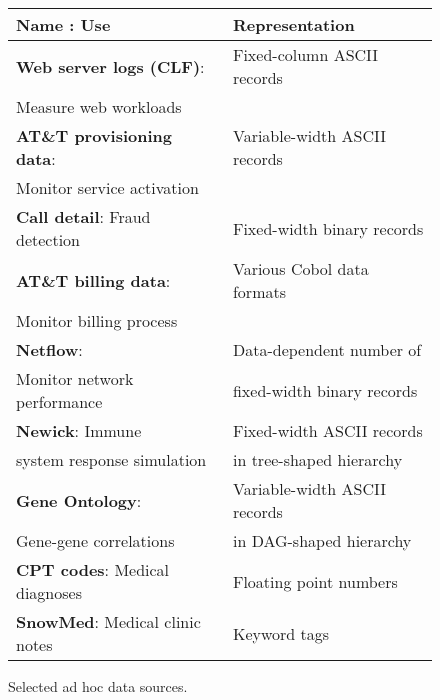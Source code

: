 \begin{figure}
\begin{center}
\begin{tabular}{l|l}
\hline
Name : Use   &  Representation               \\ \hline
\textbf{Web server logs (CLF)}:  &  Fixed-column ASCII records \\ 
Measure web workloads &                             \\ \hline
\textbf{AT\&T provisioning data}: & Variable-width ASCII records  \\ 
Monitor service activation &                              \\ \hline
\textbf{Call detail}: Fraud detection  &  Fixed-width binary records \\  \hline 
\textbf{AT\&T billing data}: & Various Cobol data formats  \\ 
Monitor billing process   &                             \\ \hline
\textbf{Netflow}:                        & Data-dependent number of     \\ 
Monitor network performance  & fixed-width binary records  \\ \hline
\textbf{Newick}:   Immune                 & Fixed-width ASCII records \\ 
system response simulation & in tree-shaped hierarchy\\ \hline                                
\textbf{Gene Ontology}:             & Variable-width ASCII records \\
Gene-gene correlations     & in DAG-shaped hierarchy \\ \hline
\textbf{CPT codes}: Medical diagnoses & Floating point numbers \\ \hline
\textbf{SnowMed}: Medical clinic notes & Keyword tags  \\ 
\end{tabular}

\caption{Selected ad hoc data sources.}
\label{figure:data-sources}
\end{center}
\end{figure}




